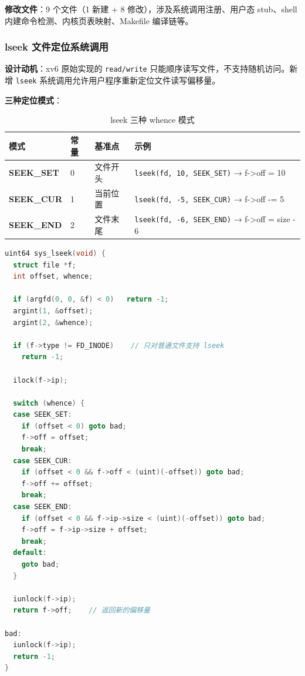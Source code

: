 \documentclass[12pt,a4paper]{ctexart}
\begin{document}
\textbf{修改文件}：9 个文件（1 新建 + 8 修改），涉及系统调用注册、用户态 stub、shell 内建命令检测、内核页表映射、Makefile 编译链等。

\subsubsection{lseek 文件定位系统调用}

\textbf{设计动机}：xv6 原始实现的 \texttt{read/write} 只能顺序读写文件，不支持随机访问。新增 \texttt{lseek} 系统调用允许用户程序重新定位文件读写偏移量。

\textbf{三种定位模式}：

\begin{table}[H]
\centering
\caption{lseek 三种 whence 模式}
\begin{tabular}{>{\bfseries}p{2.5cm}p{1.5cm}p{3cm}p{5cm}}
\toprule
\textbf{模式} & \textbf{常量} & \textbf{基准点} & \textbf{示例} \\
\midrule
SEEK\_SET & 0 & 文件开头 & \texttt{lseek(fd, 10, SEEK\_SET)} → f->off = 10 \\
SEEK\_CUR & 1 & 当前位置 & \texttt{lseek(fd, -5, SEEK\_CUR)} → f->off -= 5 \\
SEEK\_END & 2 & 文件末尾 & \texttt{lseek(fd, -6, SEEK\_END)} → f->off = size - 6 \\
\bottomrule
\end{tabular}
\end{table}

\begin{lstlisting}[language=C, caption={sys\_lseek() 核心实现（kernel/sysfile.c）}]
uint64 sys_lseek(void) {
  struct file *f;
  int offset, whence;

  if (argfd(0, 0, &f) < 0)   return -1;
  argint(1, &offset);
  argint(2, &whence);

  if (f->type != FD_INODE)    // 只对普通文件支持 lseek
    return -1;

  ilock(f->ip);

  switch (whence) {
  case SEEK_SET:
    if (offset < 0) goto bad;
    f->off = offset;
    break;
  case SEEK_CUR:
    if (offset < 0 && f->off < (uint)(-offset)) goto bad;
    f->off += offset;
    break;
  case SEEK_END:
    if (offset < 0 && f->ip->size < (uint)(-offset)) goto bad;
    f->off = f->ip->size + offset;
    break;
  default:
    goto bad;
  }

  iunlock(f->ip);
  return f->off;    // 返回新的偏移量

bad:
  iunlock(f->ip);
  return -1;
}
\end{lstlisting}
\end{document}
